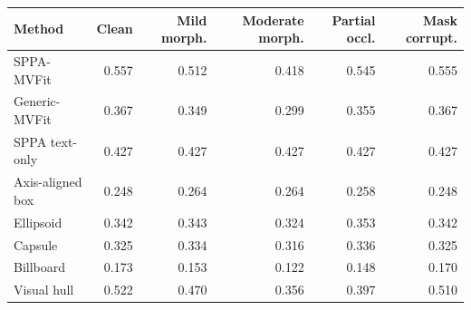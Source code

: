 \begin{tabular}{@{}lrrrrr@{}}
\toprule
Method & Clean & Mild morph. & Moderate morph. & Partial occl. & Mask corrupt. \\
\midrule
SPPA-MVFit & 0.557 & 0.512 & 0.418 & 0.545 & 0.555 \\
Generic-MVFit & 0.367 & 0.349 & 0.299 & 0.355 & 0.367 \\
SPPA text-only & 0.427 & 0.427 & 0.427 & 0.427 & 0.427 \\
Axis-aligned box & 0.248 & 0.264 & 0.264 & 0.258 & 0.248 \\
Ellipsoid & 0.342 & 0.343 & 0.324 & 0.353 & 0.342 \\
Capsule & 0.325 & 0.334 & 0.316 & 0.336 & 0.325 \\
Billboard & 0.173 & 0.153 & 0.122 & 0.148 & 0.170 \\
Visual hull & 0.522 & 0.470 & 0.356 & 0.397 & 0.510 \\
\bottomrule
\end{tabular}
